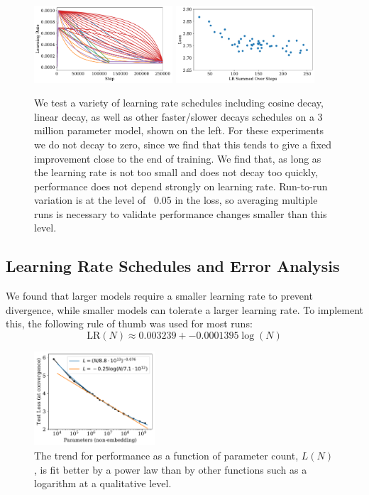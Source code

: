\documentclass[english]{article}
\begin{document}
\begin{figure}
\noindent \centering{} 
\includegraphics[width=0.46\textwidth]{VariousLearningSchedules} 
\includegraphics[width=0.46\textwidth]{LearningRateSchedulesvsPerformance} 
 \caption[Learning rate schedule scan]{
 We test a variety of learning rate schedules including cosine decay, linear decay, as well as other faster/slower decays schedules on a 3 million parameter model, shown on the left.
 For these experiments we do not decay to zero, since we find that this tends to give a fixed improvement close to the end of training.
 We find that, as long as the learning rate is not too small and does not decay too quickly, performance does not depend strongly on learning rate.
 Run-to-run variation is at the level of ~0.05 in the loss, so averaging multiple runs is necessary to validate performance changes smaller than this level.
 \label{fig:LearningRateSchedules} }
\end{figure}

\subsection{Learning Rate Schedules and Error Analysis}
\label{app:OptimizationDetailsandErrorAnalysis}

We found that larger models require a smaller learning rate to prevent divergence, while smaller models can tolerate a larger learning rate.  To implement this, the following rule of thumb was used for most runs:
\begin{equation}
\mathrm{LR}(N) \approx 0.003239 + -0.0001395  \log(N)
\end{equation}

\begin{figure}
\noindent \centering{} 
\includegraphics[width=0.40\textwidth]{PoorLogFit}
\caption[Comparison of Power-Law and Logarithmic Fits]{The trend for performance as a function of parameter count, $L(N)$, is fit better by a power law than by other functions such as a logarithm at a qualitative level.  \label{fig:PoorLogFit}}
\end{figure}
\end{document}
